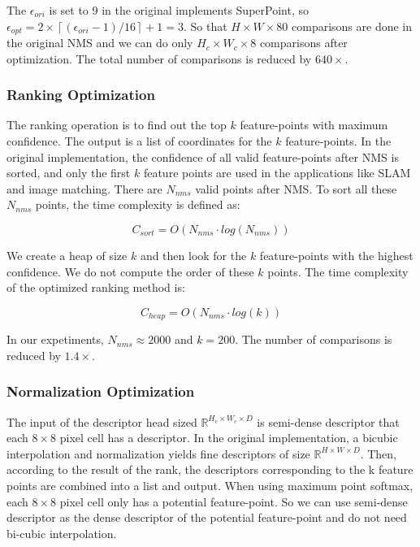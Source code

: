 The $\epsilon _{ori}$ is set to 9 in the original implements SuperPoint, so $\epsilon _{opt} = 2\times \left \lceil (\epsilon _{ori}-1)/16 \right \rceil +1 = 3$. So that $H \times W \times 80 $ comparisons are done in the original NMS and we can do only $H_c \times W_c \times 8$ comparisons after optimization. The total number of comparisons is reduced by $640\times$.

\subsubsection{Ranking Optimization}

The ranking operation is to find out the top $k$ feature-points with maximum confidence. 
The output is a list of coordinates for the $k$ feature-points. 
In the original implementation, the confidence of all valid feature-points after NMS is sorted, and only the first $k$ feature points are used in the applications like SLAM and image matching. 
There are $N_{nms}$ valid points after NMS. To sort all these $N_{nms}$ points, the time complexity is defined as:

\begin{equation}
    C_{sort} = O(N_{nms} \cdot log(N_{nms}))
    \label{equ:csort}
\end{equation}

We create a heap of size $k$ and then look for the $k$ feature-points with the highest confidence. We do not compute the order of these $k$ points. The time complexity of the optimized ranking method is:

\begin{equation}
    C_{heap} = O(N_{nms} \cdot log(k))
    \label{equ:optsort}
\end{equation}

In our expetiments, $N_{nms} \approx 2000$ and $k = 200$. The number of comparisons is reduced by $1.4\times$.

\subsubsection{Normalization Optimization}

The input of the descriptor head sized $\mathbb{R}^{H_c\times W_c\times D}$ is semi-dense descriptor that each $8\times8$ pixel cell has a descriptor. In the original implementation, a bicubic interpolation and normalization yields fine descriptors of size $\mathbb{R}^{H\times W\times D}$. Then, according to the result of the rank, the descriptors corresponding to the k feature points are combined into a list and output. When using maximum point softmax, each $8\times8$ pixel cell only has a potential feature-point. So we can use semi-dense descriptor as the dense descriptor of the potential feature-point and do not need bi-cubic interpolation.

